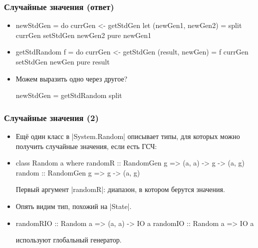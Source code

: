 \documentclass[11pt]{beamer}
\begin{document}
\begin{frame}[fragile]
  \frametitle{Случайные значения (ответ)}
  \begin{itemize}
    \item
          \begin{haskell}
            newStdGen = do 
              currGen <- getStdGen
              let (newGen1, newGen2) = split currGen
              setStdGen newGen2
              pure newGen1
          \end{haskell}
          \pause
    \item
          \begin{haskell}
            getStdRandom f = do 
              currGen <- getStdGen
              (result, newGen) = f currGen
              setStdGen newGen
              pure result
          \end{haskell}
          \pause
    \item Можем выразить одно через другое?
          \pause
          \begin{haskell}
            newStdGen = getStdRandom split
          \end{haskell}
  \end{itemize}
\end{frame}

\begin{frame}[fragile]
  \frametitle{Случайные значения (2)}
  \begin{itemize}
    \item Ещё один класс в \haskinline|System.Random| описывает типы, для которых можно получить случайные значения, если есть ГСЧ:
    \item
          \begin{haskell}
            class Random a where 
              randomR :: RandomGen g => (a, a) -> g -> (a, g) 
              random :: RandomGen g => g -> (a, g) 
          \end{haskell}
          Первый аргумент \haskinline|randomR|: диапазон, в котором берутся значения.
    \item Опять видим тип, похожий на \haskinline|State|.
    \item
          \begin{haskell}
            randomRIO :: Random a => (a, a) -> IO a
            randomIO :: Random a => IO a
          \end{haskell}
          используют глобальный генератор.
  \end{itemize}
\end{frame}
\end{document}
